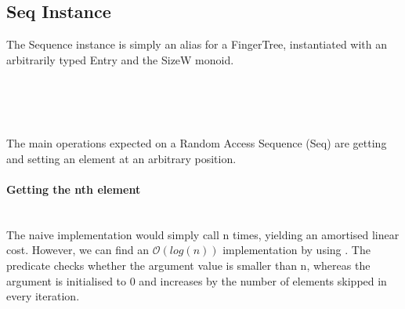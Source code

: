 \documentclass[12pt,twoside,notitlepage]{report}
\begin{document}
\subsection{Seq Instance}

The Sequence instance is simply an alias for a FingerTree, instantiated with an arbitrarily typed Entry and the SizeW monoid.

\begin{code}
\\
\>[0]\<[4]%
\>[4] \AgdaSymbol{:}  \AgdaSymbol{\{}\AgdaSymbol{\}(} \AgdaSymbol{:}  \AgdaSymbol{)}    \<%
\\
\>[0]\<[4]%
\>[4] \AgdaSymbol{\{}\AgdaSymbol{\}}   \AgdaSymbol{=}  \AgdaSymbol{(} \AgdaSymbol{)} \AgdaSymbol{(} \AgdaSymbol{\{}\AgdaSymbol{\})} \AgdaSymbol{\{}\AgdaSymbol{\}}\<%
\\
\end{code}

The main operations expected on a Random Access Sequence (Seq) are getting and setting an element at an arbitrary position.

\paragraph{Getting the nth element} \mbox{} \\ 
The naive implementation would simply call  n times, yielding an amortised linear cost. However, we can find an $\mathcal{O}(log(n))$ implementation by using . The predicate checks whether the argument value is smaller than n, whereas the argument is initialised to 0 and increases by the number of elements skipped in every iteration.
\end{document}

